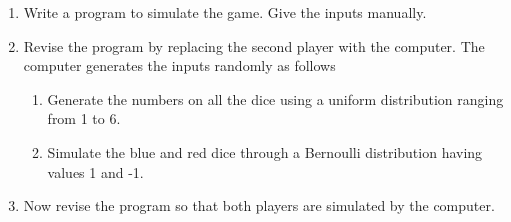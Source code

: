 %
\begin{enumerate}[label=\thesection.\arabic*, ref=\thesection.\theenumi,resume*]
	\item Write a program to simulate the game.  Give the inputs manually.
	\\
	\solution 
	
	\item Revise the program by replacing the second player with the computer.  The computer generates the inputs randomly as follows 
		\begin{enumerate}
			\item Generate the numbers on all the dice using a uniform distribution ranging from 1 to 6.
			\item Simulate the blue and red dice through a Bernoulli distribution having values 1 and -1.
		\end{enumerate}
	\solution 
	
\item Now revise the program so that both players are simulated by the computer.
\end{enumerate}
